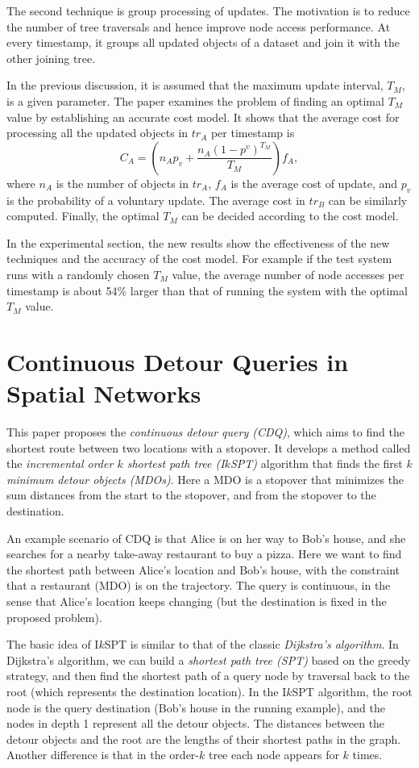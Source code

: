 \documentclass[paper=a4, fontsize=18pt]{article} %
\numberwithin{equation}{section} %
\numberwithin{figure}{section} %
\numberwithin{table}{section} %
\begin{document}
The second technique is group processing of updates. The motivation is to reduce the number of tree traversals and hence improve node access performance. At every timestamp, it groups all updated objects of a dataset and join it with the other joining tree.

In the previous discussion, it is assumed that the maximum update interval, $T_M$, is a given parameter. The paper examines the problem of finding an optimal $T_M$ value by establishing an accurate cost model. It shows that the average cost for processing all the updated objects in $tr_A$ per timestamp is
$$C_A = (n_A p_v + \frac{n_A (1 - p^v)^{T_M}}{T_M}) f_A,$$
where $n_A$ is the number of objects in $tr_A$, $f_A$ is the average cost of update, and $p_v$ is the probability of a voluntary update. The average cost in $tr_B$ can be similarly computed. Finally, the optimal $T_M$ can be decided according to the cost model.

In the experimental section, the new results show the effectiveness of the new techniques and the accuracy of the cost model. For example if the test system runs with a randomly chosen $T_M$ value, the average number of node accesses per timestamp is about 54\% larger than that of running the system with the optimal $T_M$ value.

\section{Continuous Detour Queries in Spatial Networks \cite{NTSZR12}}

This paper proposes the \emph{continuous detour query (CDQ)}, which aims to find the shortest route between two locations with a stopover. It develops a method called the \emph{incremental order $k$ shortest path tree (I$k$SPT)} algorithm that finds the first $k$ \emph{minimum detour objects (MDOs)}. Here a MDO is a stopover that minimizes the sum distances from the start to the stopover, and from the stopover to the destination.

An example scenario of CDQ is that Alice is on her way to Bob's house, and she searches for a nearby take-away restaurant to buy a pizza. Here we want to find the shortest path between Alice's location and Bob's house, with the constraint that a restaurant (MDO) is on the trajectory. The query is continuous, in the sense that Alice's location keeps changing (but the destination is fixed in the proposed problem).

The basic idea of I$k$SPT is similar to that of the classic \emph{Dijkstra's algorithm}. In Dijkstra's algorithm, we can build a \emph{shortest path tree (SPT)} based on the greedy strategy, and then find the shortest path of a query node by traversal back to the root (which represents the destination location). In the I$k$SPT algorithm, the root node is the query destination (Bob's house in the running example), and the nodes in depth 1 represent all the detour objects. The distances between the detour objects and the root are the lengths of their shortest paths in the graph. Another difference is that in the order-$k$ tree each node appears for $k$ times.
\end{document}
